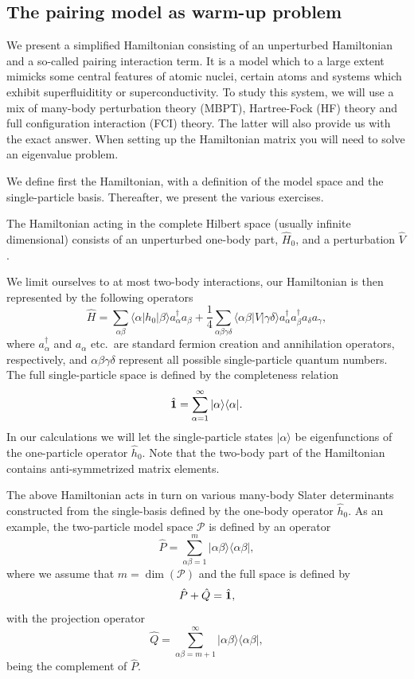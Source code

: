\documentclass[%
twoside,                 %
final,                   %
10pt]{article}
\begin{document}
\noindent
\subsection{The pairing model as warm-up problem}

We present a simplified Hamiltonian consisting of an unperturbed
Hamiltonian and a so-called pairing interaction term. It is a model
which to a large extent mimicks some central features of atomic
nuclei, certain atoms and systems which exhibit superfluiditity or
superconductivity.  To study this system, we will use a mix of
many-body perturbation theory (MBPT), Hartree-Fock (HF) theory and full
configuration interaction (FCI) theory. The latter will also provide us with
the exact answer.  When setting up the Hamiltonian matrix you will
need to solve an eigenvalue problem.

We define first the Hamiltonian, with a definition of the model space
and the single-particle basis. Thereafter, we present the various
exercises.


The Hamiltonian acting in the complete Hilbert space (usually infinite
dimensional) consists of an unperturbed one-body part, $\hat{H}_0$,
and a perturbation $\hat{V}$.

We limit ourselves to at most two-body interactions, our Hamiltonian
is then represented by the following operators
\[
\hat{H} = \sum_{\alpha\beta}\langle \alpha |h_0|\beta\rangle
a_{\alpha}^{\dagger}a_{\beta}
+\frac{1}{4}\sum_{\alpha\beta\gamma\delta}\langle \alpha\beta|
V|\gamma\delta\rangle
a_{\alpha}^{\dagger}a_{\beta}^{\dagger}a_{\delta}a_{\gamma},
\]
where $a_{\alpha}^{\dagger}$ and $a_{\alpha}$ etc.~are standard
fermion creation and annihilation operators, respectively, and
$\alpha\beta\gamma\delta$ represent all possible single-particle
quantum numbers.  The full single-particle space is defined by the
completeness relation 
\[
\hat{{\bf 1}} = \sum_{\alpha=1}^{\infty}|\alpha \rangle \langle \alpha|.
\]
In our calculations
we will let the single-particle states $|\alpha\rangle$ be
eigenfunctions of the one-particle operator $\hat{h}_0$. Note that the two-body part of the Hamiltonian 
contains anti-symmetrized matrix elements.


The above Hamiltonian acts in turn on various many-body Slater
determinants constructed from the single-basis defined by the one-body
operator $\hat{h}_0$.  As an example, the two-particle model space
$\mathcal{P}$ is defined by an operator
\[
\hat{P} = \sum_{\alpha\beta =1}^{m}|\alpha\beta \rangle \langle
\alpha\beta|,
\]
where we assume that $m=\dim(\mathcal{P})$ and the full space is
defined by
\[
\hat{P}+\hat{Q}=\hat{{\bf 1}},
\]
with the projection operator
\[
\hat{Q} = \sum_{\alpha\beta =m+1}^{\infty}|\alpha\beta \rangle \langle
\alpha\beta|,
\]
being the complement of $\hat{P}$.
\end{document}
